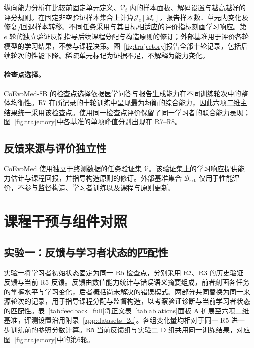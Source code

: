 纵向能力分析在比较前固定单元定义、$\mathcal V_t$ 内的样本面板、解码设置与越高越好的评分规则。在固定非空验证样本集合上计算$\mathcal J_c[M_e]$，报告样本数、单元内变化及修复/回退样本转移。不同任务采用与其目标相适应的评价指标刻画学习响应。第 $e$ 轮的独立验证反馈指导后续课程分配与构造原则的修订；外部基准用于评价各轮模型的学习结果，不参与课程决策。图~\ref{fig:trajectory}报告全部十轮记录，包括后续轮次的性能下降。稀疏单元标记为证据不足，不解释为能力变化。

\paragraph{检查点选择。}
\label{app:checkpoint_selection}
CoEvoMed-8B 的检查点选择依据医学问答与报告生成能力在不同训练轮次中的整体均衡性。R7 在所记录的十轮训练中呈现最为均衡的综合能力，因此六项二维主结果统一采用该检查点。使用同一检查点评价保留了同一学习者的联合能力表现；图~\ref{fig:trajectory}中各基准的单项峰值分别出现在 R7--R8。



\subsection{反馈来源与评价独立性}

CoEvoMed 使用独立于终测数据的任务验证集 $\mathcal V$。该验证集上的学习响应提供能力估计与课程回报，并指导构造原则的修订。外部基准集合 $\mathcal B_{\mathrm{ext}}$ 仅用于性能评价，不参与监督构造、学习者训练以及课程与原则更新。

\section{课程干预与组件对照}
\label{app:mechanisms}

\subsection{实验一：反馈与学习者状态的匹配性}
\label{app:feedback_ablation}

实验一将学习者初始状态固定为同一 R5 检查点，分别采用 R2、R3 的历史验证反馈与当前 R5 反馈。反馈由数值能力统计与错误语义摘要组成，前者刻画各任务的掌握水平与学习变化，后者概括尚未解决的错误模式。两部分共同替换为同一来源轮次的记录，用于指导课程分配与监督构造，以考察验证诊断与当前学习者状态的匹配性。表~\ref{tab:feedback_full}将正文表~\ref{tab:ablations}面板 A 扩展至六项二维基准，评测设置沿用附录~\ref{app:datasets_2d}。各组变化量均相对于同一 R5 进一步训练前的参照分数计算。R5 当前反馈组与实验二 D 组共用同一训练结果，对应图~\ref{fig:trajectory}中的第6轮。

